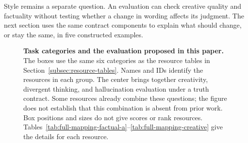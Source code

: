 Style remains a separate question. An evaluation can check creative quality
and factuality without testing whether a change in wording affects its
judgment. The next section uses the same contract components to explain
what should change, or stay the same, in five constructed examples.

\begin{figure}[!ht]
\centering
\resizebox{\textwidth}{!}{}
\caption{\textbf{Task categories and the evaluation proposed in this paper.}
The boxes use the same six categories as the resource tables in
Section~\ref{subsec:resource-tables}. Names and IDs identify the resources
in each group. The center brings together creativity, divergent thinking,
and hallucination evaluation under a truth contract. Some resources already
combine these questions; the figure does not establish that this combination
is absent from prior work. Box positions and sizes do not give scores or
rank resources. Tables~\ref{tab:full-mapping-factual-a}--\ref{tab:full-mapping-creative}
give the details for each resource.}
\label{fig:profiles}
\end{figure}
\FloatBarrier

